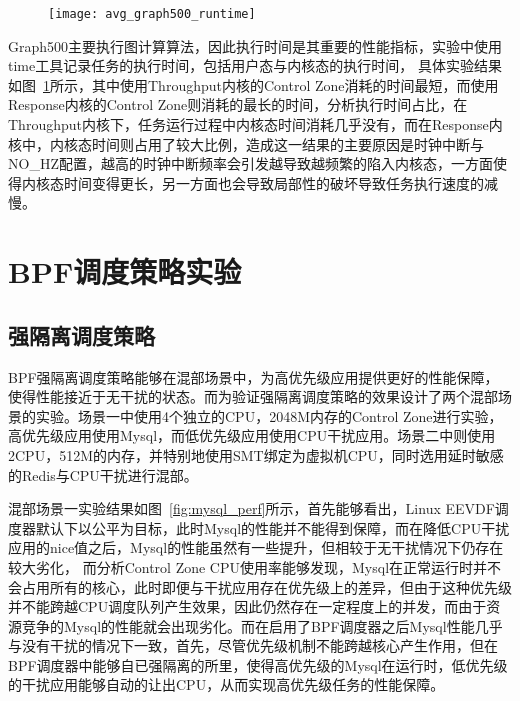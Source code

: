 \begin{figure}[!htbp][H]
    \centering
    \texttt{[image: avg\_graph500\_runtime]}
    \label{fig:avg_graph500_runtime}
\end{figure}

Graph500主要执行图计算算法，因此执行时间是其重要的性能指标，实验中使用time工具记录任务的执行时间，包括用户态与内核态的执行时间， 具体实验结果如图~\ref{fig:avg_graph500_runtime}所示，其中使用Throughput内核的Control Zone消耗的时间最短，而使用Response内核的Control Zone则消耗的最长的时间，分析执行时间占比，在Throughput内核下，任务运行过程中内核态时间消耗几乎没有，而在Response内核中，内核态时间则占用了较大比例，造成这一结果的主要原因是时钟中断与NO_HZ配置，越高的时钟中断频率会引发越导致越频繁的陷入内核态，一方面使得内核态时间变得更长，另一方面也会导致局部性的破坏导致任务执行速度的减慢。

\section{BPF调度策略实验}

\subsection{强隔离调度策略}


BPF强隔离调度策略能够在混部场景中，为高优先级应用提供更好的性能保障，使得性能接近于无干扰的状态。而为验证强隔离调度策略的效果设计了两个混部场景的实验。场景一中使用4个独立的CPU，2048M内存的Control Zone进行实验，高优先级应用使用Mysql，而低优先级应用使用CPU干扰应用。场景二中则使用2CPU，512M的内存，并特别地使用SMT绑定为虚拟机CPU，同时选用延时敏感的Redis与CPU干扰进行混部。

混部场景一实验结果如图~\ref{fig:mysql_perf}所示，首先能够看出，Linux EEVDF调度器默认下以公平为目标，此时Mysql的性能并不能得到保障，而在降低CPU干扰应用的nice值之后，Mysql的性能虽然有一些提升，但相较于无干扰情况下仍存在较大劣化， 而分析Control Zone CPU使用率能够发现，Mysql在正常运行时并不会占用所有的核心，此时即便与干扰应用存在优先级上的差异，但由于这种优先级并不能跨越CPU调度队列产生效果，因此仍然存在一定程度上的并发，而由于资源竞争的Mysql的性能就会出现劣化。而在启用了BPF调度器之后Mysql性能几乎与没有干扰的情况下一致，首先，尽管优先级机制不能跨越核心产生作用，但在BPF调度器中能够自已强隔离的所里，使得高优先级的Mysql在运行时，低优先级的干扰应用能够自动的让出CPU，从而实现高优先级任务的性能保障。

